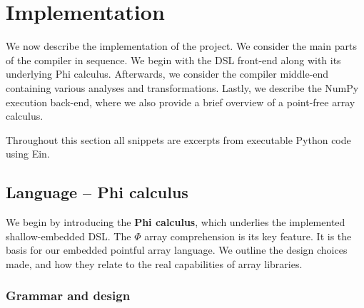 \chapter{Implementation}

We now describe the implementation of the project. We consider the main parts of the compiler in sequence. We begin with the DSL front-end along with its underlying Phi calculus. Afterwards, we consider the compiler middle-end containing various analyses and transformations. Lastly, we describe the NumPy execution back-end, where we also provide a brief overview of a point-free array calculus.

Throughout this section all snippets are excerpts from executable Python code using Ein.


\section{Language -- Phi calculus}

We begin by introducing the \textbf{Phi calculus}, which underlies the implemented shallow-embedded DSL. The $\Phi$ array comprehension is its key feature. It is the basis for our embedded pointful array language. We outline the design choices made, and how they relate to the real capabilities of array libraries.

\subsection{Grammar and design}


